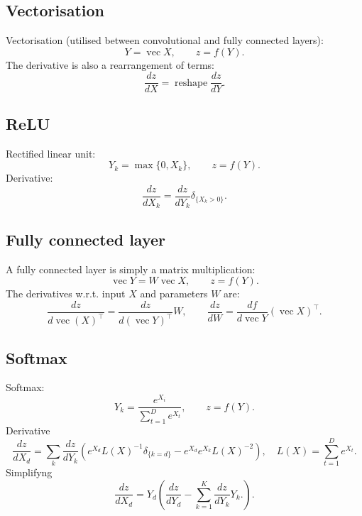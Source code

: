 \documentclass[12pt]{article}
\newcommand{\vv}{\operatorname{vec}}
\begin{document}
\subsection{Vectorisation}\label{s:vectorisation}

Vectorisation (utilised between convolutional and fully connected layers):
\[
 Y = \vv X, \qquad z = f(Y).
\]
The derivative is also a rearrangement of terms:
\[
\frac{dz}{dX} = \operatorname{reshape} \frac{dz}{dY}.
\]


\subsection{ReLU}\label{s:relu}

Rectified linear unit:
\[
 Y_k = \max\{0, X_k\}, \qquad z = f(Y).
\]
Derivative:
\[
\frac{dz}{dX_k}
=
\frac{dz}{dY_k} \delta_{\{X_k > 0 \}}.
\]

\subsection{Fully connected layer}\label{s:fully}

A fully connected layer is simply a matrix multiplication:
\[
  \vv Y = W \vv X, \qquad z = f(Y).
\]
The derivatives w.r.t. input $X$ and parameters $W$ are:
\[
\frac{dz}{d\vv(X)^\top}
= 
\frac{dz}{d(\vv Y)^\top} W,
\qquad
\frac{dz}{d W}
= 
\frac{df}{d \vv Y} (\vv X)^\top.
\]

\subsection{Softmax}\label{s:softmax}

Softmax:
\[
 Y_k = \frac{e^{X_i}}{\sum_{t=1}^D e^{X_t}}, \qquad z = f(Y).
\]
Derivative
\[
\frac{dz}{d X_d}
=
\sum_{k}
\frac{dz}{d Y_k}
\left(
e^{X_d} L(X)^{-1} \delta_{\{k=d\}}
-
e^{X_d}
e^{X_k} L(X)^{-2}
\right),
\quad
L(X) = \sum_{t=1}^D e^{X_t}.
\]
Simplifyng
\[
\frac{dz}{d X_d}
=
Y_d 
\left(
\frac{dz}{d Y_d}
-
\sum_{k=1}^K
\frac{dz}{d Y_k} Y_k.
\right).
\]
\end{document}
